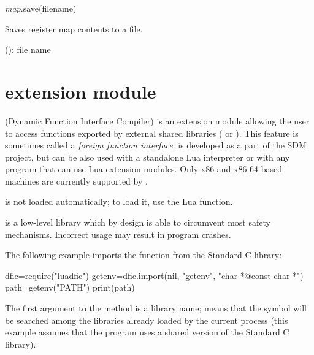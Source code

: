 \documentclass[a4paper,12pt,twoside,extrafontsizes]{memoir}
\begin{document}

\begin{luafuncprototype}
\emph{map}.save(filename)
\end{luafuncprototype}

\begin{funcdescr}
	Saves register map contents to a file.
\end{funcdescr}

\begin{funcparams}
	 (): file name
\end{funcparams}

\section[luadfic extension module]{ extension module}

 (Dynamic Function Interface Compiler) is an extension module allowing the user to access functions exported by external shared libraries ( or ). This feature is sometimes called a \emph{foreign function interface}.  is developed as a part of the SDM project, but can be also used with a standalone Lua interpreter or with any program that can use Lua extension modules. Only x86 and x86-64 based machines are currently supported by .

 is not loaded automatically; to load it, use the  Lua function.

 is a low-level library which by design is able to circumvent most safety mechanisms. Incorrect usage may result in program crashes.

The following example imports the  function from the Standard C library:

\begin{shellcmds}\begin{luacode}
dfic=require("luadfic")
getenv=dfic.import(nil, "getenv", "char *@const char *")
path=getenv("PATH")
print(path)
\end{luacode}\end{shellcmds}

The first argument to the  method is a library name;  means that the symbol will be searched among the libraries already loaded by the current process (this example assumes that the program uses a shared version of the Standard C library).
\end{document}
